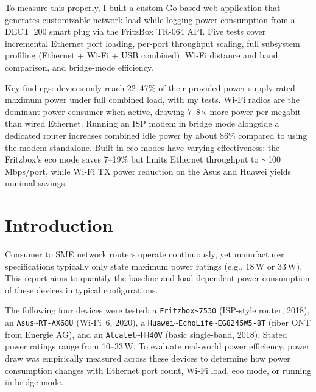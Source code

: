 \documentclass[a4paper,oneside,10pt,ngerman,english]{scrartcl}
\begin{document}
To measure this properly, I built a custom Go-based web application that generates customizable network load while logging power consumption from a \ac{DECT}~200 smart plug via the FritzBox TR-064 \ac{API}.
Five tests cover incremental Ethernet port loading, per-port throughput scaling, full subsystem profiling (Ethernet + Wi-Fi + \ac{USB} combined), Wi-Fi distance and band comparison, and bridge-mode efficiency.

Key findings: devices only reach 22--47\% of their provided power supply rated maximum power under full combined load, with my tests.
Wi-Fi radios are the dominant power consumer when active, drawing 7--8$\times$ more power per megabit than wired Ethernet.
Running an \ac{ISP} modem in bridge mode alongside a dedicated router increases combined idle power by about 86\% compared to using the modem standalone.
Built-in eco modes have varying effectiveness: the Fritzbox's eco mode saves 7--19\% but limits Ethernet throughput to $\sim$100\,Mbps/port, while Wi-Fi TX power reduction on the Asus and Huawei yields minimal savings.



\cleardoubleoddpage

\section{Introduction}
\label{sec:introduction}

Consumer to \ac{SME} network routers operate continuously, yet manufacturer specifications typically only state maximum power ratings (e.g., 18\,W or 33\,W). This report aims to quantify the baseline and load-dependent power consumption of these devices in typical configurations.

The following four devices were tested: a \verb|Fritzbox~7530| (\ac{ISP}-style router, 2018), an \verb|Asus~RT-AX68U| (Wi-Fi~6, 2020), a \verb|Huawei~EchoLife~EG8245W5-8T| (fiber \ac{ONT} from Energie AG), and an \verb|Alcatel~HH40V| (basic single-band, 2018). Stated power ratings range from 10--33\,W. To evaluate real-world power efficiency, power draw was empirically measured across these devices to determine how power consumption changes with Ethernet port count, Wi-Fi load, eco mode, or running in bridge mode.
\end{document}
